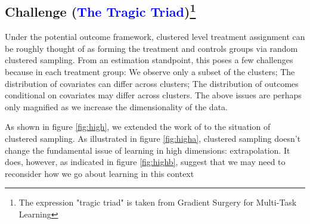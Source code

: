 \documentclass[a4paper,12pt]{article}
\begin{document}
\subsection{Challenge (\textcolor{blue}{The Tragic Triad})\footnote{The expression "tragic triad" is taken from Gradient Surgery for Multi-Task Learning}}
Under the potential outcome framework, clustered level treatment assignment can be roughly thought of as forming the treatment and controls groups via random clustered sampling. From an estimation standpoint, this poses a few challenges because in each treatment group: We observe only a subset of the clusters; The distribution of covariates can differ across clusters; The distribution of outcomes conditional on covariates may differ across clusters. The above issues are perhaps only magnified as we increase the dimensionality of the data.\par 
As shown in figure \ref{fig:high}, we extended the work of \cite{balestriero2021learning} to the situation of clustered sampling. As illustrated in figure \ref{fig:higha}, clustered sampling doesn't change the fundamental issue of learning in high dimensions: extrapolation. It does, however, as indicated in figure \ref{fig:highb}, suggest that we may need to reconsider how we go about learning in this context
\end{document}
